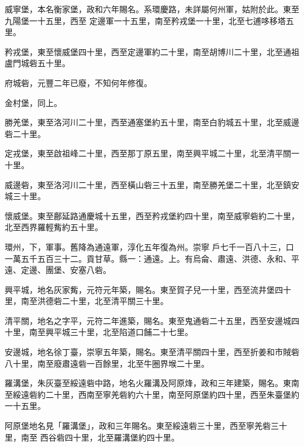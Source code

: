 \begin{pinyinscope}
 威寧堡，本名衡家堡，政和六年賜名。系環慶路，未詳屬何州軍，姑附於此。東至九陽堡一十五里，西至
 定邊軍一十五里，南至矜戎堡一十里，北至七逋哆移塔五里。



 矜戎堡，東至懷威堡四十里，西至定邊軍約二十里，南至胡博川二十里，北至通祖盧門城砦五十里。



 府城砦，元豐二年已廢，不知何年修復。



 金村堡，同上。



 勝羌堡，東至洛河川二十里，西至通塞堡約五十里，南至白豹城五十里，北至威邊砦二十里。



 定戎堡，東至啟祖峰二十里，西至那丁原五里，南至興平城二十里，北至清平關一十里。



 威邊砦，東至洛河川二十里，西至橫山砦三十五里，南至勝羌堡二十里，北至鎮安城三十里。



 懷威堡。東至鄜延路通慶城十五里，西至矜戎堡約四十里，南至威寧砦約二十里，北至西界羅輕觜約五十里。



 環州，下，軍事。舊降為通遠軍，淳化五年復為州。崇寧
 戶七千一百八十三，口一萬五千五百三十二。貢甘草。縣一：通遠。上。有烏侖、肅遠、洪德、永和、平遠、定邊、團堡、安塞八砦。



 興平城，地名灰家觜，元符元年築，賜名。東至賀子兒一十里，西至流井堡四十里，南至洪德砦二十里，北至清平關三十里。



 清平關，地名之字平，元符二年進築，賜名。東至鬼通砦二十五里，西至安邊城四十里，南至興平城三十里，北至陷道口餔二十七里。



 安邊城，地名徐丁臺，崇寧五年築，賜名。東至清平關四十里，西至折姜和市賊砦八十里，南至廢肅遠砦一百餘里，北至牛圈界堠二十里。



 羅溝堡，朱灰臺至綏遠砦中路，地名火羅溝及阿原烽，政和三年建築，賜名。東南至綏遠砦約二十里，西南至寧羌砦約六十里，南至阿原堡約四十里，西至朱臺堡約一十五里。



 阿原堡地名見「羅溝堡」，政和三年賜名。東至綏遠砦三十里，西至寧羌砦三十里，南至
 西谷砦四十里，北至羅溝堡約四十里。




\end{pinyinscope}

